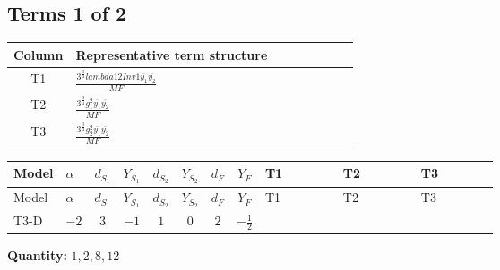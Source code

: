 \documentclass[8pt]{article}
\begin{document}
\begin{landscape}
\subsection*{Terms 1 of 2}
\begin{center}
\begin{tabular}{@{}c >{\raggedright\arraybackslash}p{0.82\linewidth}@{}}
\toprule
Column & Representative term structure \\
\midrule
T1 & \(\displaystyle \frac{3^{\frac{3}{4}} lambda12Inv1 \overline{y_{1}} \overline{y_{2}}}{MF}\) \\
\midrule
T2 & \(\displaystyle \frac{3^{\frac{3}{4}} g_{1}^{2} \overline{y_{1}} \overline{y_{2}}}{MF}\) \\
\midrule
T3 & \(\displaystyle \frac{3^{\frac{3}{4}} g_{2}^{2} \overline{y_{1}} \overline{y_{2}}}{MF}\) \\
\midrule
\bottomrule
\end{tabular}
\end{center}
\smallskip
\tiny
\begin{longtable}{@{}llcccccc >{\raggedright\arraybackslash}p{0.21\linewidth} >{\raggedright\arraybackslash}p{0.21\linewidth} >{\raggedright\arraybackslash}p{0.21\linewidth}@{}}
\toprule
Model & $\alpha$ & $d_{S_1}$ & $Y_{S_1}$ & $d_{S_2}$ & $Y_{S_2}$ & $d_F$ & $Y_F$ & T1 & T2 & T3 \\
\midrule
\endfirsthead
\toprule
Model & $\alpha$ & $d_{S_1}$ & $Y_{S_1}$ & $d_{S_2}$ & $Y_{S_2}$ & $d_F$ & $Y_F$ & T1 & T2 & T3 \\
\midrule
\endhead
T3-D & $-2$ & $3$ & $-1$ & $1$ & $0$ & $2$ & $-\frac{1}{2}$ & \scriptsize\adjustbox{max width=\linewidth}{$\begin{gathered} \frac{3^{\frac{3}{4}} lambda12Inv1 \overline{y_{1}} \overline{y_{2}}}{6 MF}\end{gathered}$} & \scriptsize\adjustbox{max width=\linewidth}{$\begin{gathered} \frac{3^{\frac{3}{4}} g_{1}^{2} \overline{y_{1}} \overline{y_{2}}}{8 MF}\end{gathered}$} & \scriptsize\adjustbox{max width=\linewidth}{$\begin{gathered} \frac{25 \cdot 3^{\frac{3}{4}} g_{2}^{2} \overline{y_{1}} \overline{y_{2}}}{24 MF}\end{gathered}$} \\
\midrule
\bottomrule
\end{longtable}
\clearpage
\noindent\textbf{Quantity: }$\mathrm{1,2,8,12}$\par\smallskip

\end{landscape}
\end{document}
